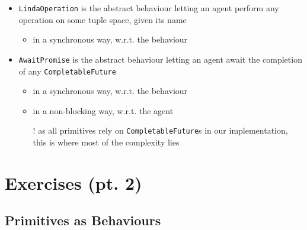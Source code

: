 \documentclass[presentation]{beamer}\mode<presentation>{\usetheme{AMSCesenaPurpleAndGold}}
\begin{document}
\begin{frame}[allowframebreaks]
\begin{itemize}
		\medskip
		
		\item \texttt{LindaOperation} is the abstract behaviour letting an agent perform \alert{any} \linda{} operation on some tuple space, given its name
		\begin{itemize}
			\item in a \alert{synchronous} way, w.r.t. the behaviour
		\end{itemize}
		
		\medskip
		
		\item \texttt{AwaitPromise} is the abstract behaviour letting an agent await the completion of \alert{any} \texttt{CompletableFuture}
		\begin{itemize}
			\item in a \alert{synchronous} way, w.r.t. the behaviour
			\item in a \alert{non-blocking} way, w.r.t. the agent
			\item[!] as all \linda{} primitives rely on \texttt{CompletableFuture}s in our implementation, this is where most of the complexity lies
		\end{itemize}
	\end{itemize}

\end{frame}

\section{Exercises (pt. 2)}

\startExercise

\subsection{\linda{} Primitives as Behaviours} 
\end{document}
